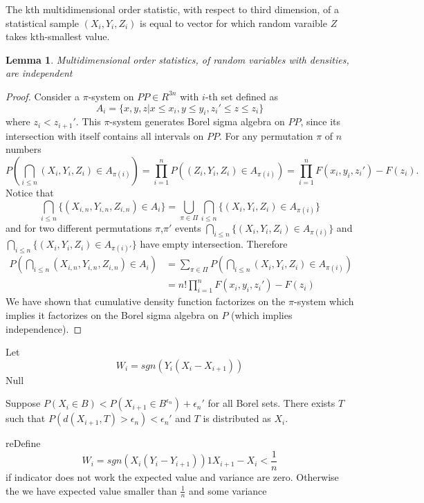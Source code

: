 \documentclass{article}
\newtheorem{lemma}{Lemma}
\begin{document}
The kth multidimensional order statistic, with respect to third dimension, of a statistical sample $(X_i,Y_i,Z_i)$  is equal to vector for which random varaible $Z$ takes kth-smallest value.

\begin{lemma}
 Multidimensional order statistics, of random variables with densities, are independent
\end{lemma}
\begin{proof}
 Consider a $\pi$-system on  $PP \in R^{3n}$ with $i$-th set defined as
 \[
  A_i = \{ x,y,z  |  x \leq x_i,  y  \leq y_{i},z_i' \leq z \leq z_i \} 
 \]
where $z_{i} < z_{i+1}'$.  This $\pi$-system generates Borel sigma algebra on $PP$, since its intersection with itself contains all intervals on $PP$.  For any permutation $\pi$ of $n$ numbers
\[
  P( \bigcap_{i \leq n} (X_i,Y_i,Z_i) \in A_{\pi(i)}) = \prod_{i=1}^n P( (Z_i,Y_i,Z_i) \in A_ {\pi(i)}) = \prod_{i=1}^n F(x_{i},y_{i},z_{i}') - F(z_{i}) .
\]
Notice that 
\[
 \bigcap_{i \leq n} \{ (X_{i,n},Y_{i,n},Z_{i,n}) \in A_i \} = \bigcup_{\pi \in \Pi}   \bigcap_{i \leq n} \{ (X_i,Y_i,Z_i) \in A_{\pi(i)} \}
\]
and for two different permutations $\pi$,$\pi'$ events  $\bigcap_{i \leq n} \{ (X_i,Y_i,Z_i) \in A_{\pi(i)} \}$ and $\bigcap_{i \leq n} \{ (X_i,Y_i,Z_i) \in A_{\pi(i)'} \}$  have empty intersection. Therefore
\begin{align*}
  P( \bigcap_{i \leq n} (X_{i,n},Y_{i,n},Z_{i,n}) \in A_i ) &=  \sum_{\pi \in \Pi}   P( \bigcap_{i \leq n} (X_i,Y_i,Z_i) \in A_{\pi(i)})  \\ 
 & =  n!  \prod_{i=1}^n F(x_{i},y_{i},z_{i}') - F(z_{i})   
\end{align*}
We have shown that cumulative density function factorizes on the $\pi$-system  which implies it factorizes on the Borel sigma algebra on $P$ (which implies independence).
\end{proof}
 Let
\[
 W_i = sgn(Y_i(X_i - X_{i+1}))
\]
Null


Suppose $P(X_i \in B )< P(X_{i+1} \in B^{\epsilon_n} ) + \epsilon_n'$ for all Borel sets. There exists $T$ such that 
$P(d(X_{i+1},T)>\epsilon_n)< \epsilon_n'$ and $T $ is distributed as $X_i$.	


reDefine 
 \[
W_i = sgn(X_i(Y_i - Y_{i+1}))1{ X_{i+1} - X_i < \frac 1 n  }  
 \]
if indicator does not work the expected value and variance are zero.  Otherwise the we have expected value smaller than $\frac 1 n$ and some variance 
\end{document}
